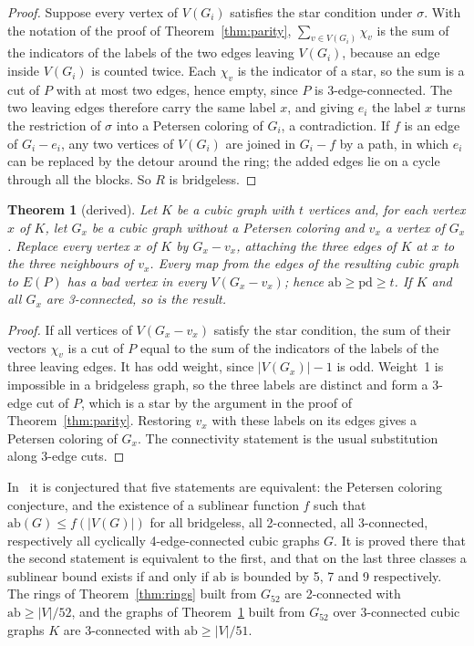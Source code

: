 \documentclass[11pt]{article}
\newtheorem{theorem}{Theorem}[section]
\theoremstyle{definition}
\theoremstyle{remark}
\newcommand{\PG}{P}
\newcommand{\Gfty}{G_{52}}
\newcommand{\pd}{\mathrm{pd}}
\newcommand{\ab}{\mathrm{ab}}
\begin{document}
\begin{proof}
Suppose every vertex of $V(G_i)$ satisfies the star condition under $\sigma$. With the notation of
the proof of Theorem~\ref{thm:parity}, $\sum_{v \in V(G_i)} \chi_v$ is the sum of the indicators of
the labels of the two edges leaving $V(G_i)$, because an edge inside $V(G_i)$ is counted twice.
Each $\chi_v$ is the indicator of a star, so the sum is a cut of $\PG$ with at most two edges, hence
empty, since $\PG$ is 3-edge-connected. The two leaving edges therefore carry the same label $x$,
and giving $e_i$ the label $x$ turns the restriction of $\sigma$ into a Petersen coloring of
$G_i$, a contradiction. If $f$ is an edge of $G_i - e_i$, any two vertices of $V(G_i)$ are joined
in $G_i - f$ by a path, in which $e_i$ can be replaced by the detour around the ring; the added
edges lie on a cycle through all the blocks. So $R$ is bridgeless.
\end{proof}

\begin{theorem}[derived]\label{thm:frames}
Let $K$ be a cubic graph with $t$ vertices and, for each vertex $x$ of $K$, let $G_x$ be a cubic
graph without a Petersen coloring and $v_x$ a vertex of $G_x$. Replace every vertex $x$ of $K$ by
$G_x - v_x$, attaching the three edges of $K$ at $x$ to the three neighbours of $v_x$. Every map
from the edges of the resulting cubic graph to $E(\PG)$ has a bad vertex in every
$V(G_x - v_x)$; hence $\ab \ge \pd \ge t$. If $K$ and all $G_x$ are 3-connected, so is the result.
\end{theorem}

\begin{proof}
If all vertices of $V(G_x - v_x)$ satisfy the star condition, the sum of their vectors $\chi_v$ is
a cut of $\PG$ equal to the sum of the indicators of the labels of the three leaving edges. It has
odd weight, since $|V(G_x)| - 1$ is odd. Weight~1 is impossible in a bridgeless graph, so the
three labels are distinct and form a 3-edge cut of $\PG$, which is a star by the argument in the
proof of Theorem~\ref{thm:parity}. Restoring $v_x$ with these labels on its edges gives a Petersen
coloring of $G_x$. The connectivity statement is the usual substitution along 3-edge cuts.
\end{proof}

In~\cite{MMM2021} it is conjectured that five statements are equivalent: the Petersen coloring
conjecture, and the existence of a sublinear function $f$ such that $\ab(G) \le f(|V(G)|)$ for
all bridgeless, all 2-connected, all 3-connected, respectively all cyclically 4-edge-connected
cubic graphs $G$. It is proved there that the second statement is equivalent to the first, and
that on the last three classes a sublinear bound exists if and only if $\ab$ is bounded by 5, 7
and 9 respectively. The rings of Theorem~\ref{thm:rings} built from $\Gfty$ are 2-connected with
$\ab \ge |V|/52$, and the graphs of Theorem~\ref{thm:frames} built from $\Gfty$ over 3-connected
cubic graphs $K$ are 3-connected with $\ab \ge |V|/51$.
\end{document}
